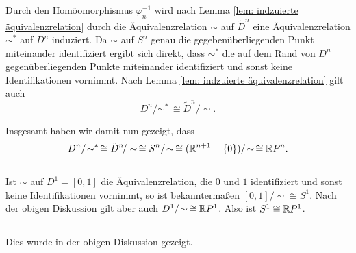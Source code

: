 \documentclass[a4paper,10pt]{article}
\begin{document}
Durch den Homöomorphismus $\varphi_n^{-1}$ wird nach Lemma \ref{lem: indzuierte äquivalenzrelation} durch die Äquivalenzrelation $\sim$ auf $\tilde{D}^n$ eine Äquivalenzrelation $\sim^*$ auf $D^n$ induziert. Da $\sim$ auf $S^n$ genau die gegebenüberliegenden Punkt miteinander identifiziert ergibt sich direkt, dass $\sim^*$ die auf dem Rand von $D^n$ gegenüberliegenden Punkte miteinander identifiziert und sonst keine Identifikationen vornimmt. Nach Lemma \ref{lem: indzuierte äquivalenzrelation} gilt auch
\[
 D^n/\!\sim^*\, \cong \tilde{D}^n/\!\sim.
\]

Insgesamt haben wir damit nun gezeigt, dass
\[
 D^n/\!\sim^*\,
 \cong \tilde{D}^n\!/\sim\,
 \cong S^n/\!\sim\,
 \cong (\mathbb{R}^{n+1}-\{0\})/\!\sim\,
 \cong \mathbb{R} P^n.
\]

\subsection{}
Ist $\sim$ auf $D^1 = [0,1]$ die Äquivalenzrelation, die $0$ und $1$ identifiziert und sonst keine Identifikationen vornimmt, so ist bekanntermaßen $[0,1]/\!\sim \cong S^1$. Nach der obigen Diskussion gilt aber auch $D^1/\!\sim\, \cong \mathbb{R} P^1$. Also ist $S^1 \cong \mathbb{R} P^1$.

\subsection{}
Dies wurde in der obigen Diskussion gezeigt.
\end{document}
